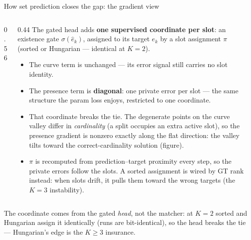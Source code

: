 \begin{frame}{How set prediction closes the gap: the gradient view}
\begin{columns}[T]
\begin{column}{0.56\textwidth}
    \end{column}
    \begin{column}{0.44\textwidth}
      \small
      The gated head adds \textbf{one supervised coordinate per slot}: an existence
      gate $\sigma(\hat e_k)$, assigned to its target $e_k$ by a slot assignment $\pi$
      (sorted or Hungarian --- identical at $K{=}2$).
      \begin{itemize}
        \item The curve term is unchanged --- its error signal still carries no slot
              identity.
        \item The presence term is \textbf{diagonal}: one private error per slot ---
              the same structure the param loss enjoys, restricted to one coordinate.
        \item That coordinate breaks the tie. The degenerate points on the curve
              valley differ in \emph{cardinality} (a split occupies an extra active
              slot), so the presence gradient is nonzero exactly along the flat
              direction: the valley tilts toward the correct-cardinality solution
              (figure).
        \item $\pi$ is recomputed from prediction--target proximity every step, so the
              private errors follow the slots. A sorted assignment is wired by GT rank
              instead: when slots drift, it pulls them toward the wrong targets (the
              $K{=}3$ instability).
      \end{itemize}
    \end{column}
  \end{columns}
  \vspace{2pt}
  {\scriptsize\color{accent} The coordinate comes from the gated \emph{head}, not the
  matcher: at $K{=}2$ sorted and Hungarian assign it identically (runs are bit-identical),
  so the head breaks the tie --- Hungarian's edge is the $K{\ge}3$ insurance.\par}
\end{frame}
